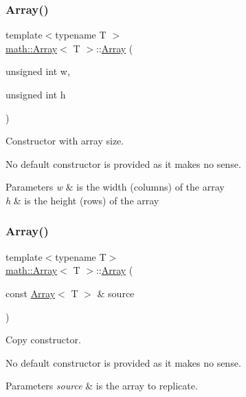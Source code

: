 \subsubsection{\texorpdfstring{Array()}{Array()}\hspace{0.1cm}{\footnotesize\ttfamily [1/2]}}
{\footnotesize\ttfamily template$<$typename T $>$ \\
\hyperlink{classmath_1_1_array}{math\+::\+Array}$<$ T $>$\+::\hyperlink{classmath_1_1_array}{Array} (\begin{DoxyParamCaption}\item[{unsigned int}]{w,  }\item[{unsigned int}]{h }\end{DoxyParamCaption})}

Constructor with array size.

No default constructor is provided as it makes no sense.


\begin{DoxyParams}{Parameters}
{\em w} & is the width (columns) of the array \\
\hline
{\em h} & is the height (rows) of the array \\
\hline
\end{DoxyParams}
\mbox{\label{classmath_1_1_array_aeff48bdf1a2cca8d2e338730a48cf79d}} 
\subsubsection{\texorpdfstring{Array()}{Array()}\hspace{0.1cm}{\footnotesize\ttfamily [2/2]}}
{\footnotesize\ttfamily template$<$typename T$>$ \\
\hyperlink{classmath_1_1_array}{math\+::\+Array}$<$ T $>$\+::\hyperlink{classmath_1_1_array}{Array} (\begin{DoxyParamCaption}\item[{const \hyperlink{classmath_1_1_array}{Array}$<$ T $>$ \&}]{source }\end{DoxyParamCaption})}

Copy constructor.

No default constructor is provided as it makes no sense.


\begin{DoxyParams}{Parameters}
{\em source} & is the array to replicate. \\
\hline
\end{DoxyParams}
\mbox{\label{classmath_1_1_array_a68c3eb186d34387d63908b78937d7aee}} 
